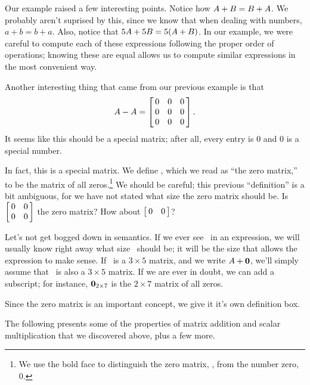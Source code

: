 Our example raised a few interesting points. Notice how $\tta + \ttb = \ttb + \tta$. We probably aren't suprised by this, since we know that when dealing with numbers, $a+b = b+a$. Also, notice that $5\tta+5\ttb = 5(\tta+\ttb)$. In our example, we were careful to compute each of these expressions following the proper order of operations; knowing these are equal allows us to compute similar expressions in the most convenient way. 

Another interesting thing that came from our previous example is that $$\tta - \tta = \bmx{ccc}0&0&0\\0&0&0\\0&0&0\emx.$$ It seems like this should be a special matrix; after all, every entry is 0 and 0 is a special number. 

In fact, this is a special matrix. We define \tto, which we read as ``the zero matrix,'' to be the matrix of all zeros.\footnote{We use the bold face to distinguish the zero matrix, \tto, from the number zero, 0. } We should be careful; this previous ``definition'' is a bit ambiguous, for we have not stated what size the zero matrix should be. Is $\bmx{cc}0&0\\0&0\\ \emx$ the zero matrix? How about $\bmx{cc} 0&0\emx$?

Let's not get bogged down in semantics. If we ever see \tto\ in an expression, we will usually know right away what size \tto\ should be; it will be the size that allows the expression to make sense. If \tta\ is a $3\times 5$ matrix, and we write $\tta + \tto$, we'll simply assume that \tto\ is also a $3\times 5$ matrix. If we are ever in doubt, we can add a subscript; for instance, $\tto_{2\times 7}$ is the $2\times7$ matrix of all zeros.

Since the zero matrix is an important concept, we give it it's own definition box.


\enlargethispage{3\baselineskip}

The following presents some of the properties of matrix addition and scalar multiplication that we discovered above, plus a few more.

